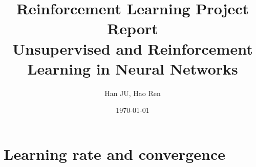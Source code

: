 \documentclass[a4paper, 12pt]{article}
\title{Reinforcement Learning Project Report \\ \vspace{0.5cm} \large Unsupervised and Reinforcement Learning in Neural Networks}
\author{Han JU, Hao Ren}
\date{\today}
\begin{document}
\maketitle
\section{Learning rate and convergence}
\end{document}
